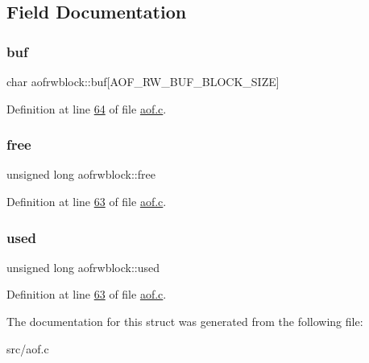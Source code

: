 \subsection{Field Documentation}
\mbox{\label{structaofrwblock_a6701e9c90e19caa8d66c46e015bcc314}} 
\subsubsection{\texorpdfstring{buf}{buf}}
{\footnotesize\ttfamily char aofrwblock\+::buf\mbox{[}A\+O\+F\+\_\+\+R\+W\+\_\+\+B\+U\+F\+\_\+\+B\+L\+O\+C\+K\+\_\+\+S\+I\+ZE\mbox{]}}



Definition at line \hyperlink{aof_8c_source_l00064}{64} of file \hyperlink{aof_8c_source}{aof.\+c}.

\mbox{\label{structaofrwblock_a9eb8333f2c33eb2d1d2cf7e312363bf4}} 
\subsubsection{\texorpdfstring{free}{free}}
{\footnotesize\ttfamily unsigned long aofrwblock\+::free}



Definition at line \hyperlink{aof_8c_source_l00063}{63} of file \hyperlink{aof_8c_source}{aof.\+c}.

\mbox{\label{structaofrwblock_a3169da759f876f081ac1a3b31ac3fae1}} 
\subsubsection{\texorpdfstring{used}{used}}
{\footnotesize\ttfamily unsigned long aofrwblock\+::used}



Definition at line \hyperlink{aof_8c_source_l00063}{63} of file \hyperlink{aof_8c_source}{aof.\+c}.



The documentation for this struct was generated from the following file\+:\begin{DoxyCompactItemize}
\item 
src/aof.\+c\end{DoxyCompactItemize}
